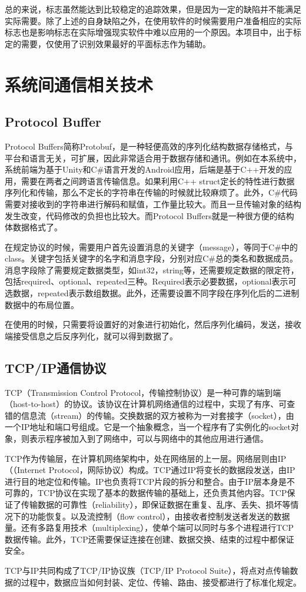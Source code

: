 总的来说，标志虽然能达到比较稳定的追踪效果，但是因为一定的缺陷并不能满足实际需要。除了上述的自身缺陷之外，在使用软件的时候需要用户准备相应的实际标志也是影响标志在实际增强现实软件中难以应用的一个原因。本项目中，出于标定的需要，仅使用了识别效果最好的平面标志作为辅助。

\section{系统间通信相关技术}
\subsection{Protocol Buffer}
Protocol Buffers简称Protobuf，是一种轻便高效的序列化结构数据存储格式，与平台和语言无关，可扩展，因此非常适合用于数据存储和通讯。例如在本系统中，系统前端为基于Unity和C\#语言开发的Android应用，后端是基于C++开发的应用，需要在两者之间跨语言传输信息。如果利用C++ struct定长的特性进行数据序列化和传输，那么不定长的字符串在传输的时候就比较麻烦了。此外，C\#代码需要对接收到的字符串进行解码和赋值，工作量比较大。而且一旦传输对象的结构发生改变，代码修改的负担也比较大。而Protocol Buffers就是一种很方便的结构体数据格式了。

在规定协议的时候，需要用户首先设置消息的关键字（message），等同于C\#中的class。关键字包括关键字的名字和消息字段，分别对应C\#总的类名和数据成员。消息字段除了需要规定数据类型，如int32，string等，还需要规定数据的限定符，包括required、optional、repeated三种。Required表示必要数据，optional表示可选数据，repeated表示数组数据。此外，还需要设置不同字段在序列化后的二进制数据中的布局位置。

在使用的时候，只需要将设置好的对象进行初始化，然后序列化编码，发送，接收端接受信息之后反序列化，就可以得到数据了。

\subsection{TCP/IP通信协议}
	TCP（Transmission Control Protocol，传输控制协议）是一种可靠的端到端（host-to-host）的协议。该协议在计算机网络通信的过程中，实现了有序、可查错的信息流（stream）的传输。交换数据的双方被称为一对套接字（socket），由一个IP地址和端口号组成。它是一个抽象概念，当一个程序有了实例化的socket对象，则表示程序被加入到了网络中，可以与网络中的其他应用进行通信。
	
	TCP作为传输层，在计算机网络架构中，处在网络层的上一层。网络层则由IP（（Internet Protocol，网际协议）构成。TCP通过IP将变长的数据段发送，由IP进行目的地定位和传输。IP也负责将TCP片段的拆分和整合。由于IP层本身是不可靠的，TCP协议在实现了基本的数据传输的基础上，还负责其他内容。TCP保证了传输数据的可靠性（reliability），即保证数据在重复、乱序、丢失、损坏等情况下的功能恢复。以及流控制（flow control），由接收者控制发送者发送的数据量。还有多路复用技术（multiplexing），使单个端可以同时与多个进程进行TCP数据传输。此外，TCP还需要保证连接在创建、数据交换、结束的过程中都保证安全。
	
	TCP与IP共同构成了TCP/IP协议族（TCP/IP Protocol Suite），将点对点传输数据的过程中，数据应当如何封装、定位、传输、路由、接受都进行了标准化规定。

